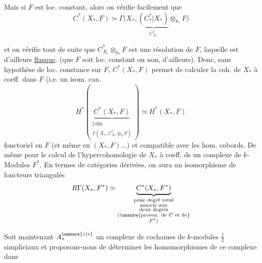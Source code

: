 
Mais si $F$ est loc. constant, alors on vérifie facilement que
\[
C^*(X_*,F)\simeq
\Gamma\bigl(X_*,\underbrace{(C_*^*|X_*)}_{C_{X_*}^*}\otimes_{k_*}F\bigr)
\]

et on vérifie tout de suite que $C_{X_*}^*\otimes_{k_*}F$ est une résolution de $F$, laquelle est d'ailleurs \uline{flasque}.  (que $F$ soit loc. constant ou non, d'ailleurs). Donc, sans hypothèse de loc. constance sur $F$, $C^*(X_*,F)$ permet de calculer la coh. de $X_*$ à coeff. dans $F$ (i.e.  un isom. can.
\[
H^*\left(
\underbrace{C^*(X_*,F)}_{
\substack{\Vert\,\mathrm{dfn}\\\Gamma(X_*,C_{X_*}^*\otimes_kF)}
}
\right)\simeq H^*(X_*,F)
\]
  fonctoriel en $F$ (et même en $(X_*,F)\ldots$) et compatible avec les hom. cobords. De même pour le calcul de l'hypercohomologie de $X_*$ à coeff. ds un complexe de $k$-Modules $F^*$. En termes de catégories dérivées, on aura un isomorphisme de foncteurs triangulés
\[
R\Gamma(X_*,F^*)\simeq
\underbrace{C^*(X_*,F^*)}_{
\substack{\text{pour degré total}\\
\text{associé aux}\\
\text{deux degrés}\\
(\unsure{\text{proven. de }C\text{ et de}}\\F^*)}}
\]


Soit maintenant $A_*^{\unsure{\circ|*}}$ un  complexe de cochaines de $k$-modules $\frac12$ simpliciaux
et proposons-nous de déterminer les homomorphismes de ce complexe dans

